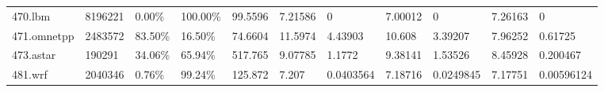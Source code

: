 \documentclass[11pt]{article}
\begin{document}
\begin{landscape}
\begin{table}
\begin{tabular}{lllllllllll}
470.lbm                                                                                   & 8196221                                                                                      & 0.00\%                                                                                          & 100.00\%                                                                                         & 99.5596                                                                                          & 7.21586                           & 0                                 & 7.00012                           & 0                                 & 7.26163                           & 0                                 \\
471.omnetpp                                                                               & 2483572                                                                                      & 83.50\%                                                                                         & 16.50\%                                                                                          & 74.6604                                                                                          & 11.5974                           & 4.43903                           & 10.608                            & 3.39207                           & 7.96252                           & 0.61725                           \\
473.astar                                                                                 & 190291                                                                                       & 34.06\%                                                                                         & 65.94\%                                                                                          & 517.765                                                                                          & 9.07785                           & 1.1772                            & 9.38141                           & 1.53526                           & 8.45928                           & 0.200467                          \\
481.wrf                                                                                   & 2040346                                                                                      & 0.76\%                                                                                          & 99.24\%                                                                                          & 125.872                                                                                          & 7.207                             & 0.0403564                         & 7.18716                           & 0.0249845                         & 7.17751                           & 0.00596124                        \\

\end{tabular}
\end{table}
\end{landscape}
\end{document}
